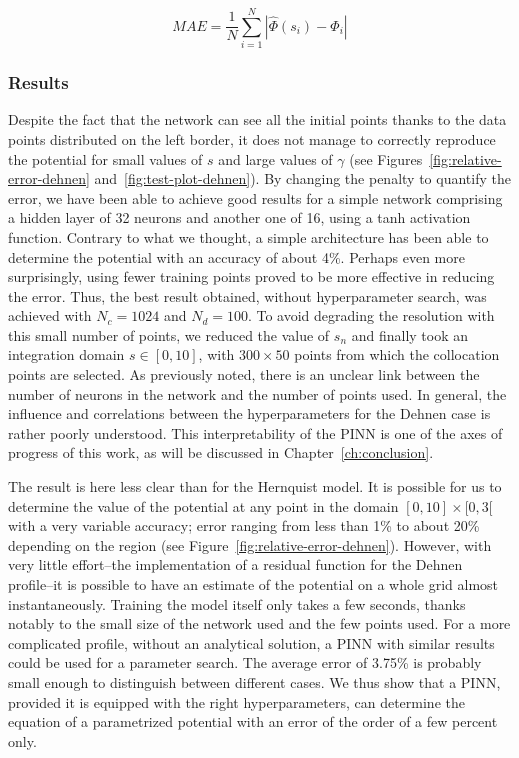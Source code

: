 \begin{equation}
\label{eq:mae}
    MAE = \frac{1}{N}\sum_{i=1}^{N} \left| \hat{\Phi}(s_i) - \Phi_i\right|
\end{equation}

\subsubsection{Results}

Despite the fact that the network can see all the initial points thanks to the data points distributed on the left border, it does not manage to correctly reproduce the potential for small values of $s$ and large values of $\gamma$ (see Figures~\ref{fig:relative-error-dehnen} and~\ref{fig:test-plot-dehnen}). By changing the penalty to quantify the error, we have been able to achieve good results for a simple network comprising a hidden layer of 32 neurons and another one of 16, using a tanh activation function. Contrary to what we thought, a simple architecture has been able to determine the potential with an accuracy of about 4\%. Perhaps even more surprisingly, using fewer training points proved to be more effective in reducing the error. Thus, the best result obtained, without hyperparameter search, was achieved with $N_c = 1024$ and $N_d=100$. To avoid degrading the resolution with this small number of points, we reduced the value of $s_n$ and finally took an integration domain $s \in [0, 10]$, with $300\times50$ points from which the collocation points are selected. As previously noted, there is an unclear link between the number of neurons in the network and the number of points used. In general, the influence and correlations between the hyperparameters for the Dehnen case is rather poorly understood. This interpretability of the PINN is one of the axes of progress of this work, as will be discussed in Chapter~\ref{ch:conclusion}.

The result is here less clear than for the Hernquist model. It is possible for us to determine the value of the potential at any point in the domain $[0, 10] \times [0, 3[$ with a very variable accuracy; error ranging from less than 1\% to about 20\% depending on the region (see Figure~\ref{fig:relative-error-dehnen}). However, with very little effort--the implementation of a residual function for the Dehnen profile--it is possible to have an estimate of the potential on a whole grid almost instantaneously. Training the model itself only takes a few seconds, thanks notably to the small size of the network used and the few points used. For a more complicated profile, without an analytical solution, a PINN with similar results could be used for a parameter search. The average error of 3.75\% is probably small enough to distinguish between different cases. We thus show that a PINN, provided it is equipped with the right hyperparameters, can determine the equation of a parametrized potential with an error of the order of a few percent only.

